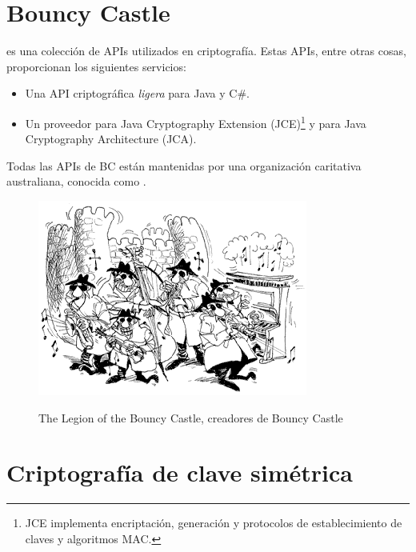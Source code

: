 
 \section{Bouncy Castle}

  es una colección de APIs utilizados en criptografía.
 Estas APIs, entre otras cosas, proporcionan los siguientes servicios:
 \begin{itemize}
 \item Una API criptográfica \emph{ligera} para Java y C\#.
 \item Un proveedor para Java Cryptography Extension (JCE)\footnote{JCE implementa encriptación, generación y protocolos de establecimiento de claves y algoritmos MAC.} y para Java Cryptography Architecture (JCA).
 \end{itemize}

 Todas las APIs de BC están mantenidas por una organización caritativa australiana, conocida como . \emph{\parencite{Reference4}}

 \begin{figure}[ht]
   \centering
   \includegraphics[scale=0.5]{Figures/BouncyCastle}
   \decoRule
   \caption[Legion of the Bouncy Castle]{The Legion of the Bouncy Castle, creadores de Bouncy Castle} \emph{\parencite{Reference4}}
   \label{fig:BouncyCastle}
 \end{figure}


 \section{Criptografía de clave simétrica}

